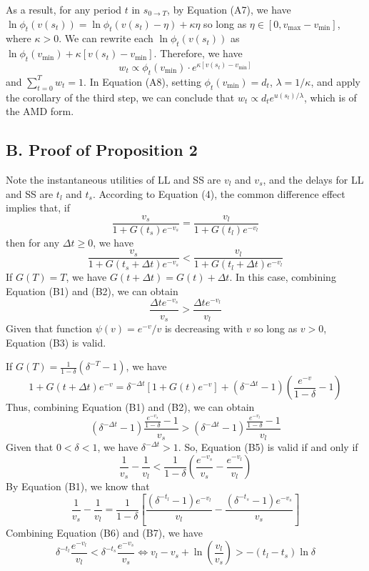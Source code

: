 \documentclass[
  12pt,
]{article}
\begin{document}
As a result, for any period \(t\) in \(s_{0\rightarrow T}\), by Equation
(A7), we have \(\ln \phi_t(v(s_t))=\ln\phi_t(v(s_t)-\eta)+\kappa\eta\)
so long as \(\eta\in[0,v_{\max}-v_{\min}]\), where \(\kappa>0\). We can
rewrite each \(\ln \phi_t(v(s_t))\) as
\(\ln \phi_t(v_{\min})+\kappa[v(s_t)-v_{\min}]\). Therefore, we
have\[\tag{A8}
w_t \propto \phi_t(v_{\min})\cdot e^{\kappa[v(s_t)-v_{\min}]}
\]and \(\sum_{t=0}^T w_t=1\). In Equation (A8), setting
\(\phi_t(v_{\min})=d_t\), \(\lambda = 1/\kappa\), and apply the
corollary of the third step, we can conclude that
\(w_t\propto d_t e^{u(s_t)/\lambda}\), which is of the AMD form.

\hypertarget{b.-proof-of-proposition-2}{%
\subsection*{B. Proof of Proposition
2}\label{b.-proof-of-proposition-2}}

Note the instantaneous utilities of LL and SS are \(v_l\) and \(v_s\),
and the delays for LL and SS are \(t_l\) and \(t_s\). According to
Equation (4), the common difference effect implies that, if\[ \tag{B1}
\frac{v_s}{1+G(t_s)e^{-v_s}} = \frac{v_l}{1+G(t_l)e^{-v_l}}
\]then for any \(\Delta t \geq 0\), we have \[ \tag{B2}
\frac{v_s}{1+G(t_s+\Delta t)e^{-v_s}} < \frac{v_l}{1+G(t_l+\Delta t)e^{-v_l}}
\]If \(G(T)=T\), we have \(G(t+\Delta t) = G(t) + \Delta t\). In this
case, combining Equation (B1) and (B2), we can obtain\[ \tag{B3}
\frac{\Delta t e^{-v_s}}{v_s} > \frac{\Delta t e^{-v_l}}{v_l}
\]Given that function \(\psi(v) = e^{-v}/v\) is decreasing with \(v\) so
long as \(v>0\), Equation (B3) is valid.

If \(G(T) = \frac{1}{1-\delta}(\delta^{-T}-1)\), we have\[\tag{B4}
1+G(t+\Delta t)e^{-v} = \delta^{-\Delta t}[1+G(t)e^{-v}]+(\delta^{-\Delta t}-1)(\frac{e^{-v}}{1-\delta}-1)
\] Thus, combining Equation (B1) and (B2), we can obtain\[\tag{B5}
(\delta^{-\Delta t}-1)\frac{\frac{e^{-v_s}}{1-\delta}-1}{v_s} >
(\delta^{-\Delta t}-1)\frac{\frac{e^{-v_l}}{1-\delta}-1}{v_l}
\] Given that \(0<\delta<1\), we have \(\delta^{-\Delta t}>1\). So,
Equation (B5) is valid if and only if\[\tag{B6}
\frac{1}{v_s}-\frac{1}{v_l}<\frac{1}{1-\delta}(\frac{e^{-v_s}}{v_s}-\frac{e^{-v_l}}{v_l})
\] By Equation (B1), we know that\[\tag{B7}
\frac{1}{v_s}-\frac{1}{v_l}=\frac{1}{1-\delta}\left[\frac{(\delta^{-t_l}-1)e^{-v_l}}{v_l} -\frac{(\delta^{-t_s}-1)e^{-v_s}}{v_s}\right]
\] Combining Equation (B6) and (B7), we have\[
\delta^{-t_l}\frac{e^{-v_l}}{v_l}<\delta^{-t_s}\frac{e^{-v_s}}{v_s} \Longleftrightarrow v_l - v_s + \ln \left(\frac{v_l}{v_s}\right)>-(t_l-t_s)\ln\delta
\]
\end{document}
